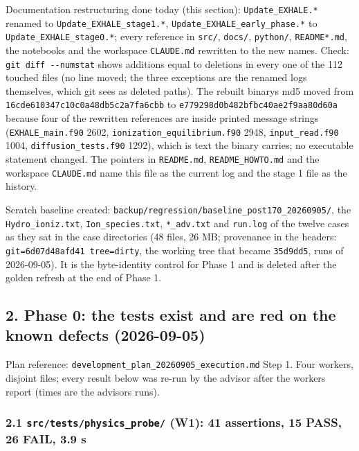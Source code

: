 \documentclass[english,a4paper]{my_memo}
\begin{document}
Documentation restructuring done today (this section): \texttt{Update\_EXHALE.*}
renamed to \texttt{Update\_EXHALE\_stage1.*}, \texttt{Update\_EXHALE\_early\_phase.*} to
\texttt{Update\_EXHALE\_stage0.*}; every reference in \texttt{src/}, \texttt{docs/}, \texttt{python/},
\texttt{README*.md}, the notebooks and the workspace \texttt{CLAUDE.md} rewritten to the
new names. Check: \texttt{git\ diff\ -\/-numstat} shows additions equal to deletions
in every one of the 112 touched files (no line moved; the three exceptions are
the renamed logs themselves, which git sees as deleted paths). The rebuilt
binary\textquotesingle s md5 moved from \texttt{16cde610347c10c0a48db5c2a7fa6cbb} to
\texttt{e779298d0b482bfbc40ae2f9aa80d60a} because four of the rewritten references
are inside printed message strings (\texttt{EXHALE\_main.f90} 2602,
\texttt{ionization\_equilibrium.f90} 2948, \texttt{input\_read.f90} 1004,
\texttt{diffusion\_tests.f90} 1292), which is text the binary carries; no executable
statement changed. The pointers in \texttt{README.md}, \texttt{README\_HOWTO.md} and the
workspace \texttt{CLAUDE.md} name this file as the current log and the stage 1 file
as the history.

Scratch baseline created: \texttt{backup/regression/baseline\_post170\_20260905/}, the
\texttt{Hydro\_ioniz.txt}, \texttt{Ion\_species.txt}, \texttt{*\_adv.txt} and \texttt{run.log} of the twelve
cases as they sat in the case directories (48 files, 26 MB; provenance in
the headers: \texttt{git=6d07d48afd41\ tree=dirty}, the working tree that became
\texttt{35d9dd5}, runs of 2026-09-05). It is the byte-identity control for Phase 1
and is deleted after the golden refresh at the end of Phase 1.

\subsection{2. Phase 0: the tests exist and are red on the known defects (2026-09-05)}\label{2-phase-0-the-tests-exist-and-are-red-on-the-known-defects-2026-09-05}

Plan reference: \texttt{development\_plan\_20260905\_execution.md} Step 1. Four
workers, disjoint files; every result below was re-run by the advisor after
the worker\textquotesingle s report (times are the advisor\textquotesingle s runs).

\subsubsection{\texorpdfstring{2.1 \texttt{src/tests/physics\_probe/} (W1): 41 assertions, 15 PASS, 26 FAIL, 3.9 s}{2.1 src/tests/physics\_probe/ (W1): 41 assertions, 15 PASS, 26 FAIL, 3.9 s}}\label{21-srctestsphysics_probe-w1-41-assertions-15-pass-26-fail-39-s}
\end{document}
